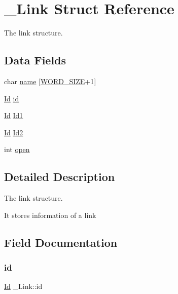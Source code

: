 \hypertarget{struct__Link}{}\section{\+\_\+\+Link Struct Reference}
\label{struct__Link}


The link structure.  


\subsection*{Data Fields}
\begin{DoxyCompactItemize}
\item 
char \hyperlink{struct__Link_a020ee863120055b29609157b9de3c84d}{name} \mbox{[}\hyperlink{types_8h_a92ed8507d1cd2331ad09275c5c4c1c89}{W\+O\+R\+D\+\_\+\+S\+I\+ZE}+1\mbox{]}
\item 
\hyperlink{types_8h_a845e604fb28f7e3d97549da3448149d3}{Id} \hyperlink{struct__Link_a151212e7a8e8274c2a1ee991ba95878b}{id}
\item 
\hyperlink{types_8h_a845e604fb28f7e3d97549da3448149d3}{Id} \hyperlink{struct__Link_a7efa2d80092dce3e13223e81c9ad82c7}{Id1}
\item 
\hyperlink{types_8h_a845e604fb28f7e3d97549da3448149d3}{Id} \hyperlink{struct__Link_a805761a24070055970a61550df3b7607}{Id2}
\item 
int \hyperlink{struct__Link_a5df9107f4ea513f3741d9e4883f4678a}{open}
\end{DoxyCompactItemize}


\subsection{Detailed Description}
The link structure. 

It stores information of a link 

\subsection{Field Documentation}
\mbox{\label{struct__Link_a151212e7a8e8274c2a1ee991ba95878b}} 
\subsubsection{\texorpdfstring{id}{id}}
{\footnotesize\ttfamily \hyperlink{types_8h_a845e604fb28f7e3d97549da3448149d3}{Id} \+\_\+\+Link\+::id}

